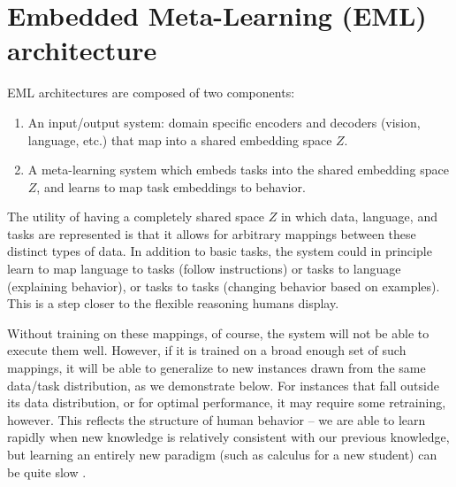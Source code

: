 \documentclass{article}
\begin{document}
\section{Embedded Meta-Learning (EML) architecture}
EML architectures are composed of two components: 
\vspace{-0.75em}
\begin{enumerate} \setlength \itemsep{0em}
\item An input/output system: domain specific encoders and decoders (vision, language, etc.) that map into a shared embedding space $Z$.
\item A meta-learning system which embeds tasks into the shared embedding space $Z$, and learns to map task embeddings to behavior.
\end{enumerate}
\vspace{-0.75em}
The utility of having a completely shared space $Z$ in which data, language, and tasks are represented is that it allows for arbitrary mappings between these distinct types of data. In addition to basic tasks, the system could in principle learn to map language to tasks (follow instructions) or tasks to language (explaining behavior), or tasks to tasks (changing behavior based on examples). This is a step closer to the flexible reasoning humans display. \par
Without training on these mappings, of course, the system will not be able to execute them well. However, if it is trained on a broad enough set of such mappings, it will be able to generalize to new instances drawn from the same data/task distribution, as we demonstrate below. For instances that fall outside its data distribution, or for optimal performance, it may require some retraining, however. This reflects the structure of human behavior -- we are able to learn rapidly when new knowledge is relatively consistent with our previous knowledge, but learning an entirely new paradigm (such as calculus for a new student) can be quite slow \citep[c.f.][]{Kumaran2016}. \par 
\end{document}
